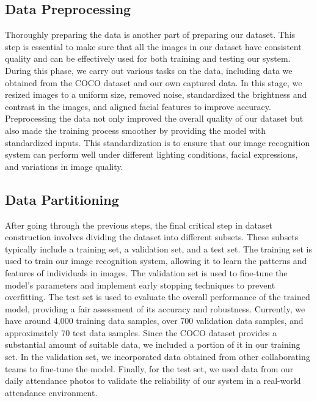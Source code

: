 \subsection{Data Preprocessing}
\label{subsec:method}
Thoroughly preparing the data is another part of preparing our dataset. This step is essential to make sure that all the images in our dataset have consistent quality and can be effectively used for both training and testing our system. During this phase, we carry out various tasks on the data, including data we obtained from the COCO dataset and our own captured data. In this stage, we resized images to a uniform size, removed noise, standardized the brightness and contrast in the images, and aligned facial features to improve accuracy. Preprocessing the data not only improved the overall quality of our dataset but also made the training process smoother by providing the model with standardized inputs. This standardization is to ensure that our image recognition system can perform well under different lighting conditions, facial expressions, and variations in image quality.\\
\label{sec:method}
\subsection{Data Partitioning}
\label{subsec:method}
After going through the previous steps, the final critical step in dataset construction involves dividing the dataset into different subsets. These subsets typically include a training set, a validation set, and a test set. The training set is used to train our image recognition system, allowing it to learn the patterns and features of individuals in images. The validation set is used to fine-tune the model's parameters and implement early stopping techniques to prevent overfitting. The test set is used to evaluate the overall performance of the trained model, providing a fair assessment of its accuracy and robustness. Currently, we have around 4,000 training data samples, over 700 validation data samples, and approximately 70 test data samples. Since the COCO dataset provides a substantial amount of suitable data, we included a portion of it in our training set. In the validation set, we incorporated data obtained from other collaborating teams to fine-tune the model. Finally, for the test set, we used data from our daily attendance photos to validate the reliability of our system in a real-world attendance environment.\\
